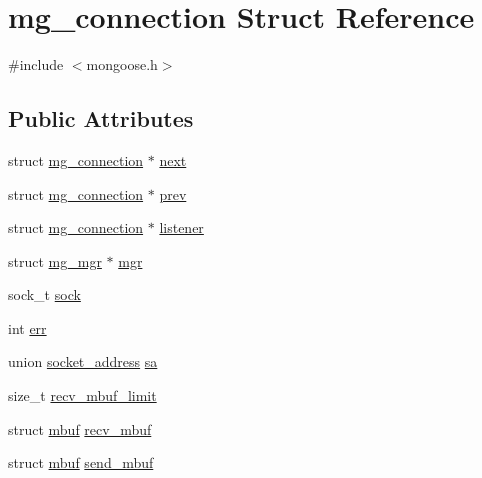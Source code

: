 \hypertarget{structmg__connection}{}\section{mg\+\_\+connection Struct Reference}
\label{structmg__connection}


{\ttfamily \#include $<$mongoose.\+h$>$}

\subsection*{Public Attributes}
\begin{DoxyCompactItemize}
\item 
struct \hyperlink{structmg__connection}{mg\+\_\+connection} $\ast$ \hyperlink{structmg__connection_afcfd89f119a87cba6f6dfec2d2eda5d9_afcfd89f119a87cba6f6dfec2d2eda5d9}{next}
\item 
struct \hyperlink{structmg__connection}{mg\+\_\+connection} $\ast$ \hyperlink{structmg__connection_aa93fd5ca83f11230bc971a68a7fa8d5e_aa93fd5ca83f11230bc971a68a7fa8d5e}{prev}
\item 
struct \hyperlink{structmg__connection}{mg\+\_\+connection} $\ast$ \hyperlink{structmg__connection_a9392bec67d0dc8df58e6c171214ddf8d_a9392bec67d0dc8df58e6c171214ddf8d}{listener}
\item 
struct \hyperlink{structmg__mgr}{mg\+\_\+mgr} $\ast$ \hyperlink{structmg__connection_ac341f1f2bd18e030fe90a914e4517506_ac341f1f2bd18e030fe90a914e4517506}{mgr}
\item 
sock\+\_\+t \hyperlink{structmg__connection_a608f2461b3dd53e503d6ed3c84ec55b0_a608f2461b3dd53e503d6ed3c84ec55b0}{sock}
\item 
int \hyperlink{structmg__connection_aa13a0bd4a2ce3d6384866acb7e00344a_aa13a0bd4a2ce3d6384866acb7e00344a}{err}
\item 
union \hyperlink{unionsocket__address}{socket\+\_\+address} \hyperlink{structmg__connection_a3dfa1816f5a4b0725d9d04be75bbb3f8_a3dfa1816f5a4b0725d9d04be75bbb3f8}{sa}
\item 
size\+\_\+t \hyperlink{structmg__connection_ab15e90e7fb7b8719cc7dcc67f45856e1_ab15e90e7fb7b8719cc7dcc67f45856e1}{recv\+\_\+mbuf\+\_\+limit}
\item 
struct \hyperlink{structmbuf}{mbuf} \hyperlink{structmg__connection_a72adb9aba4bbe59a9bd591de496713b3_a72adb9aba4bbe59a9bd591de496713b3}{recv\+\_\+mbuf}
\item 
struct \hyperlink{structmbuf}{mbuf} \hyperlink{structmg__connection_a70076f5da9c9d01e77acb3547941671c_a70076f5da9c9d01e77acb3547941671c}{send\+\_\+mbuf}

\end{DoxyCompactItemize}
